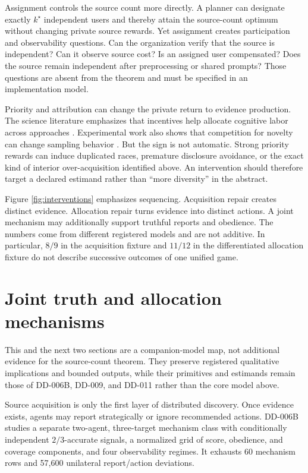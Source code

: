 \documentclass[11pt]{article}
\begin{document}
Assignment controls the source count more directly. A planner can designate
exactly $k^\star$ independent users and thereby attain the source-count optimum without changing
private source rewards. Yet assignment creates participation and observability
questions. Can the organization verify that the source is independent? Can it
observe source cost? Is an assigned user compensated? Does the source remain
independent after preprocessing or shared prompts? Those questions are absent
from the theorem and must be specified in an implementation model.

Priority and attribution can change the private return to evidence production.
The science literature emphasizes that incentives help allocate cognitive labor
across approaches \citep{Kitcher1990}. Experimental work also shows that
competition for novelty can change sampling behavior \citep{TiokhinDerex2019}.
But the sign is not automatic. Strong priority rewards can induce duplicated
races, premature disclosure avoidance, or the exact kind of interior
over-acquisition identified above. An intervention should therefore target a
declared estimand rather than ``more diversity'' in the abstract.



Figure \ref{fig:interventions} emphasizes sequencing. Acquisition repair creates
distinct evidence. Allocation repair turns evidence into distinct actions. A
joint mechanism may additionally support truthful reports and obedience. The
numbers come from different registered models and are not additive. In
particular, $8/9$ in the acquisition fixture and $11/12$ in the differentiated
allocation fixture do not describe successive outcomes of one unified game.

\section{Joint truth and allocation mechanisms}

This and the next two sections are a companion-model map, not additional
evidence for the source-count theorem. They preserve registered qualitative
implications and bounded outputs, while their primitives and estimands remain
those of DD-006B, DD-009, and DD-011 rather than the core model above.

Source acquisition is only the first layer of distributed discovery. Once
evidence exists, agents may report strategically or ignore recommended actions.
DD-006B studies a separate two-agent, three-target mechanism class with
conditionally independent $2/3$-accurate signals, a normalized grid of score,
obedience, and coverage components, and four observability regimes. It exhausts
60 mechanism rows and 57,600 unilateral report/action deviations.
\end{document}
